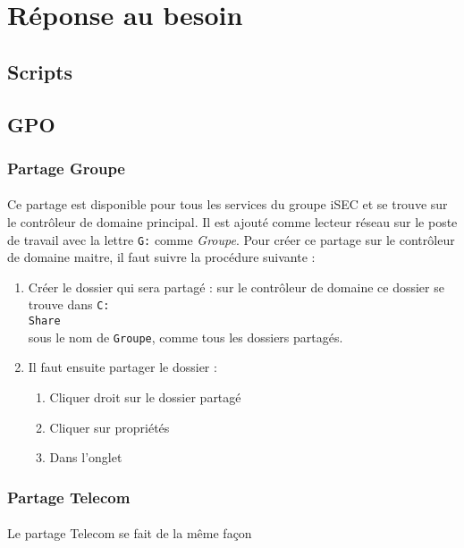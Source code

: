 \section{Réponse au besoin}
	\subsection{Scripts}
	\subsection{GPO}
		\subsubsection{Partage Groupe}
			\paragraph{}
				Ce partage est disponible pour tous les services du groupe iSEC et se trouve sur le contrôleur de domaine principal. Il est ajouté comme lecteur réseau sur le poste de travail avec la lettre \texttt{G:} comme \textit{Groupe}. Pour créer ce partage sur le contrôleur de domaine maitre, il faut suivre la procédure suivante :

				\begin{enumerate}
					\item Créer le dossier qui sera partagé : sur le contrôleur de domaine ce dossier se trouve dans \texttt{C:\\Share\\} sous le nom de \texttt{Groupe}, comme tous les dossiers partagés.
					\item Il faut ensuite partager le dossier : 
						\begin{enumerate}
							\item Cliquer droit sur le dossier partagé
							\item Cliquer sur propriétés
							\item Dans l'onglet
						\end{enumerate}  
				\end{enumerate}
		\subsubsection{Partage Telecom}
			\paragraph{}
				Le partage Telecom se fait de la même façon
